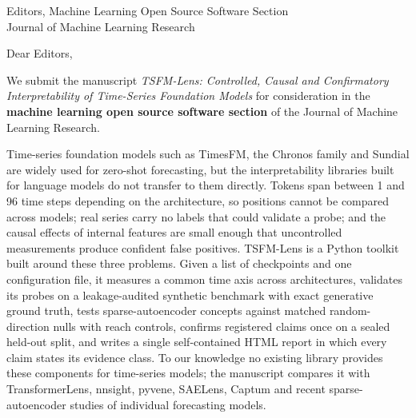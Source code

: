 \documentclass[11pt]{letter}
\date{October 30, 2026}
\begin{document}
\begin{letter}{Editors, Machine Learning Open Source Software Section\\
Journal of Machine Learning Research}

\opening{Dear Editors,}

We submit the manuscript \emph{TSFM-Lens: Controlled, Causal and Confirmatory Interpretability of Time-Series
Foundation Models} for consideration in the \textbf{machine learning open source software section} of the Journal of
Machine Learning Research.

Time-series foundation models such as TimesFM, the Chronos family and Sundial are widely used for zero-shot
forecasting, but the interpretability libraries built for language models do not transfer to them directly. Tokens
span between 1 and 96 time steps depending on the architecture, so positions cannot be compared across models; real
series carry no labels that could validate a probe; and the causal effects of internal features are small enough that
uncontrolled measurements produce confident false positives. TSFM-Lens is a Python toolkit built around these three
problems. Given a list of checkpoints and one configuration file, it measures a common time axis across architectures,
validates its probes on a leakage-audited synthetic benchmark with exact generative ground truth, tests sparse-autoencoder
concepts against matched random-direction nulls with reach controls, confirms registered claims once on a sealed held-out
split, and writes a single self-contained HTML report in which every claim states its evidence class. To our knowledge no
existing library provides these components for time-series models; the manuscript compares it with TransformerLens,
nnsight, pyvene, SAELens, Captum and recent sparse-autoencoder studies of individual forecasting models.


\end{letter}
\end{document}

